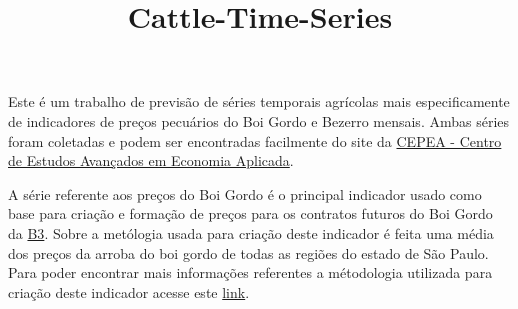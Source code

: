 \documentclass[11pt]{article}
\title{Cattle-Time-Series}
\begin{document}
    
    \maketitle
    
    

    
    

    Este é um trabalho de previsão de séries temporais agrícolas mais
especificamente de indicadores de preços pecuários do Boi Gordo e
Bezerro mensais. Ambas séries foram coletadas e podem ser encontradas
facilmente do site da \href{https://www.cepea.esalq.usp.br/br}{CEPEA -
Centro de Estudos Avançados em Economia Aplicada}.

A série referente aos preços do Boi Gordo é o principal indicador usado
como base para criação e formação de preços para os contratos futuros do
Boi Gordo da \href{http://www.b3.com.br/pt_br/}{B3}. Sobre a metólogia
usada para criação deste indicador é feita uma média dos preços da
arroba do boi gordo de todas as regiões do estado de São Paulo. Para
poder encontrar mais informações referentes a métodologia utilizada para
criação deste indicador acesse este
\href{https://www.cepea.esalq.usp.br/upload/kceditor/files/Cepea_B3_Metodologia_Indicador_BOI_02_01_2020.pdf}{link}.
\end{document}
